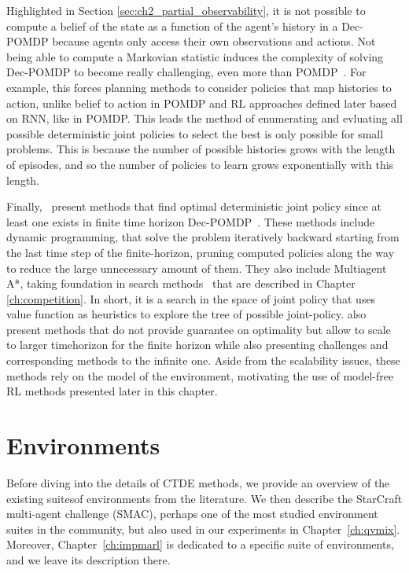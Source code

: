 Highlighted in Section \ref{sec:ch2_partial_observability}, it is not possible to compute a belief of the state as a function of the agent's history in a Dec-POMDP because agents only access their own observations and actions.
Not being able to compute a Markovian statistic induces the complexity of solving Dec-POMDP to become really challenging, even more than POMDP~\citep{DecPomdp}.
For example, this forces planning methods to consider policies that map histories to action, unlike belief to action in POMDP and RL approaches defined later based on RNN, like in POMDP.
This leads the method of enumerating and evluating all possible deterministic joint policies to select the best is only possible for small problems.
This is because the number of possible histories grows with the length of episodes, and so the number of policies to learn grows exponentially with this length.

Finally,~\cite{DecPomdp} present methods that find optimal deterministic joint policy since at least one exists in finite time horizon Dec-POMDP~\citep{oliehoek2008optimal}.
These methods include dynamic programming, that solve the problem iteratively backward starting from the last time step of the finite-horizon, pruning computed policies along the way to reduce the large unnecessary amount of them.
They also include Multiagent A*, taking foundation in search methods~\citep{russel2010} that are described in Chapter \ref{ch:competition}.
In short, it is a search in the space of joint policy that uses value function as heuristics to explore the tree of possible joint-policy.
\cite{DecPomdp} also present methods that do not provide guarantee on optimality but allow to scale to larger timehorizon for the finite horizon while also presenting challenges and corresponding methods to the infinite one.
Aside from the scalability issues, these methods rely on the model of the environment, motivating the use of model-free RL methods presented later in this chapter.

\section{Environments}
\label{sec:ch3_env}
Before diving into the details of CTDE methods, we provide an overview of the existing suites\footnotemark  of environments from the literature.
We then describe the StarCraft multi-agent challenge (SMAC), perhaps one of the most studied environment suites in the community, but also used in our experiments in Chapter~\ref{ch:qvmix}.
Moreover, Chapter~\ref{ch:impmarl} is dedicated to a specific suite of environments, and we leave its description there.

